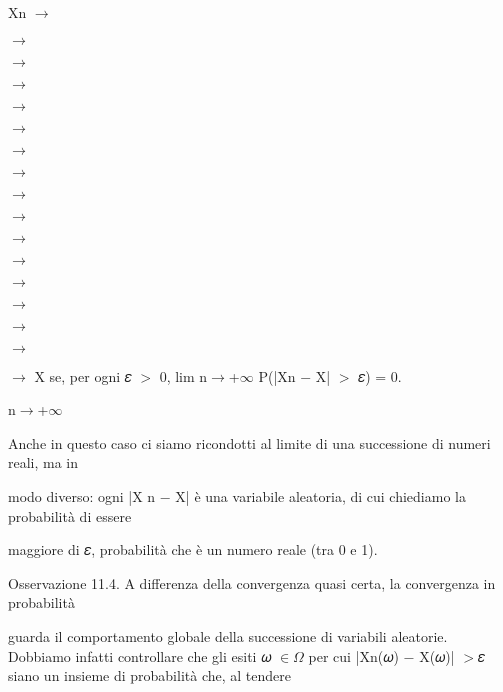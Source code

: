 \documentclass[a4paper,portrait,12pt]{article}
\begin{document}
\begin{flushleft}
Xn $\rightarrow$
\end{flushleft}


$\rightarrow$


$\rightarrow$


$\rightarrow$


$\rightarrow$


$\rightarrow$


$\rightarrow$


$\rightarrow$


$\rightarrow$


$\rightarrow$


$\rightarrow$


$\rightarrow$


$\rightarrow$


$\rightarrow$


$\rightarrow$


$\rightarrow$


\begin{flushleft}
$\rightarrow$ X se, per ogni 𝜀 $>$ 0, lim n$\rightarrow$+$\infty$ P(|Xn $-$ X| $>$ 𝜀) = 0.
\end{flushleft}


\begin{flushleft}
n$\rightarrow$+$\infty$
\end{flushleft}





\begin{flushleft}
Anche in questo caso ci siamo ricondotti al limite di una successione di numeri reali, ma in
\end{flushleft}


\begin{flushleft}
modo diverso: ogni |X n $-$ X| \`{e} una variabile aleatoria, di cui chiediamo la probabilit\`{a} di essere
\end{flushleft}


\begin{flushleft}
maggiore di 𝜀, probabilit\`{a} che \`{e} un numero reale (tra 0 e 1).
\end{flushleft}


\begin{flushleft}
Osservazione 11.4. A differenza della convergenza quasi certa, la convergenza in probabilit\`{a}
\end{flushleft}


\begin{flushleft}
guarda il comportamento globale della successione di variabili aleatorie. Dobbiamo infatti controllare che gli esiti 𝜔 $\in$$\Omega$ per cui |Xn(𝜔) $-$ X(𝜔)| $>$𝜀 siano un insieme di probabilit\`{a} che, al tendere
\end{flushleft}
\end{document}
